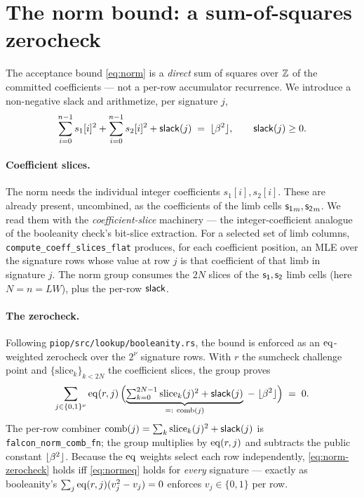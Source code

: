 \section{The norm bound: a sum-of-squares zerocheck}\label{sec:norm}

The acceptance bound \eqref{eq:norm} is a \emph{direct} sum of squares
over $\mathbb{Z}$ of the committed coefficients --- not a per-row accumulator
recurrence. We introduce a non-negative slack and arithmetize, per
signature $j$,
\begin{equation}\label{eq:normeq}
  \sum_{i=0}^{n-1} s_1[i]^2 + \sum_{i=0}^{n-1} s_2[i]^2 + \mathsf{slack}(j)
  \;=\; \lfloor \beta^2 \rfloor, \qquad \mathsf{slack}(j) \ge 0 .
\end{equation}

\paragraph{Coefficient slices.}
The norm needs the individual integer coefficients $s_1[i], s_2[i]$.
These are already present, uncombined, as the coefficients of the limb
cells $\mathsf{s_1}_m, \mathsf{s_2}_m$. We read them with the
\emph{coefficient-slice} machinery --- the integer-coefficient analogue
of the booleanity check's bit-slice extraction. For a selected set of
limb columns, \texttt{compute\_coeff\_slices\_flat} produces, for each
coefficient position, an MLE over the signature rows whose value at row
$j$ is that coefficient of that limb in signature $j$. The norm group
consumes the $2N$ slices of the $\mathsf{s_1},\mathsf{s_2}$ limb cells (here
$N = n = LW$), plus the per-row $\mathsf{slack}$.

\paragraph{The zerocheck.}
Following \texttt{piop/src/lookup/booleanity.rs}, the bound is enforced as
an $\operatorname{eq}$-weighted zerocheck over the $2^{\nu}$ signature rows. With
$r$ the sumcheck challenge point and $\{\mathrm{slice}_k\}_{k<2N}$ the
coefficient slices, the group proves
\begin{equation}\label{eq:norm-zerocheck}
  \sum_{j \in \{0,1\}^{\nu}} \operatorname{eq}(r, j)\,
  \Bigl( \underbrace{\textstyle\sum_{k=0}^{2N-1} \mathrm{slice}_k(j)^2
         + \mathsf{slack}(j)}_{=:\ \mathrm{comb}(j)}
         \;-\; \lfloor \beta^2 \rfloor \Bigr) \;=\; 0 .
\end{equation}
The per-row combiner $\mathrm{comb}(j) = \sum_k \mathrm{slice}_k(j)^2 +
\mathsf{slack}(j)$ is \texttt{falcon\_norm\_comb\_fn}; the group multiplies
by $\operatorname{eq}(r,j)$ and subtracts the public constant $\lfloor \beta^2 \rfloor$. Because the
$\operatorname{eq}$ weights select each row independently, \eqref{eq:norm-zerocheck}
holds iff \eqref{eq:normeq} holds for \emph{every} signature --- exactly as
booleanity's $\sum_j \operatorname{eq}(r,j)(v_j^2 - v_j) = 0$ enforces $v_j\in\{0,1\}$
per row.

